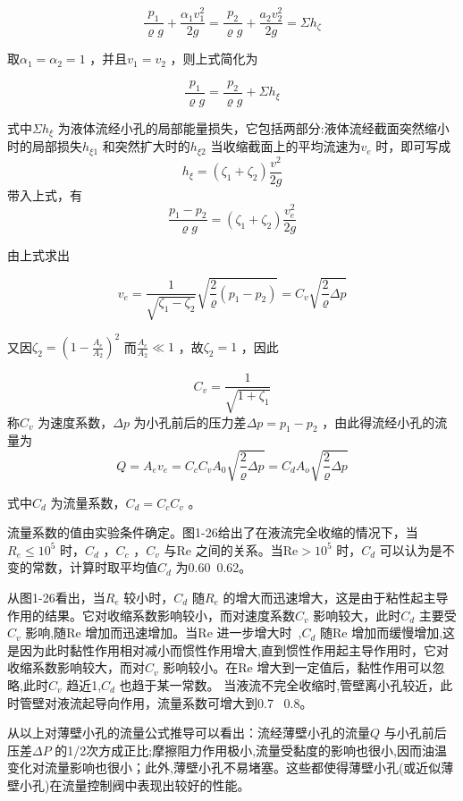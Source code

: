 
$$ \frac{p_1}{\varrho g}+\frac{\alpha _1v_{1}^{2}}{2g}=\frac{p_2}{\varrho g}+\frac{a_2v_{2}^{2}}{2g}=\varSigma h_{\zeta} $$ 

\noindent 取$ \alpha _1=\alpha _2=1 $ ，并且$ v_1=v_2 $ ，则上式简化为

$$ \frac{p_1}{\varrho g}=\frac{p_2}{\varrho g}+\varSigma h_{\xi} $$ 

\noindent 式中$ \varSigma h_{\xi} $ 为液体流经小孔的局部能量损失，它包括两部分:液体流经截面突然缩小时的局部损失$ h_{\xi 1} $ 和突然扩大时的$ h_{\xi 2} $ 当收缩截面上的平均流速为$ v_e $ 时，即可写成
$$ h_{\xi}=\left( \zeta _1+\zeta _2 \right) \frac{v^2}{2g} $$
\noindent 带入上式，有
$$ \frac{p_1-p_2}{\varrho g}=\left( \zeta _1+\zeta _2 \right) \frac{v_{e}^{2}}{2g} $$ 

\noindent 由上式求出

$$ v_e=\frac{1}{\sqrt{\zeta _1-\zeta _2}}\sqrt{\frac{2}{\varrho}\left( p_1-p_2 \right)}=C_v\sqrt{\frac{2}{\varrho}\varDelta p} $$ 

\noindent 又因$ \zeta _2=\left( 1-\frac{A_e}{A_2} \right) ^2 $ 而$ \frac{A_e}{A_2}\ll 1 $ ，故$ \zeta _2=1 $ ，因此

$$ C_v=\frac{1}{\sqrt{1+\zeta _1}} $$ 
\noindent 称$ C_v $ 为速度系数，$ \varDelta p $ 为小孔前后的压力差$ \varDelta p=p_1-p_2 $ ，由此得流经小孔的流量为
$$ Q=A_ev_e=C_cC_vA_0\sqrt{\frac{2}{\varrho}\varDelta p}=C_dA_o\sqrt{\frac{2}{\varrho}\varDelta p} $$ 

\noindent 式中$ C_d $ 为流量系数，$ C_d=C_cC_v $ 。

流量系数的值由实验条件确定。图1-26给出了在液流完全收缩的情况下，当$ R_e\le 10^5 $ 时，$ C_d $ ，$ C_c $ ，$ C_v $ 与$ \text{Re} $ 之间的关系。当$ \text{Re}>10^5 $ 时，$ C_d $ 可以认为是不变的常数，计算时取平均值$ C_d $ 为0.60~0.62。

从图1-26看出，当$ R_e $ 较小时，$ C_d $ 随$ R_e $ 的增大而迅速增大，这是由于粘性起主导作用的结果。它对收缩系数影响较小，而对速度系数$ C_v $ 影响较大，此时$ C_d $ 主要受$ C_v $ 影响,随$ \text{Re} $ 增加而迅速增加。当$ \text{Re} $ 进一步增大时 ,$ C_d $ 随$ \text{Re} $ 增加而缓慢增加,这是因为此时黏性作用相对减小而惯性作用增大,直到惯性作用起主导作用时，它对收缩系数影响较大，而对$ C_v $ 影响较小。在$ \text{Re} $ 增大到一定值后，黏性作用可以忽略,此时$ C_v $ 趋近1,$ C_d $ 也趋于某一常数。
当液流不完全收缩时,管壁离小孔较近，此时管壁对液流起导向作用，流量系数可增大到0.7~ 0.8。

从以上对薄壁小孔的流量公式推导可以看出：流经薄壁小孔的流量$ Q $ 与小孔前后压差$ \varDelta P $ 的1/2次方成正比;摩擦阻力作用极小,流量受黏度的影响也很小,因而油温变化对流量影响也很小；此外,薄壁小孔不易堵塞。这些都使得薄壁小孔(或近似薄壁小孔)在流量控制阀中表现出较好的性能。

